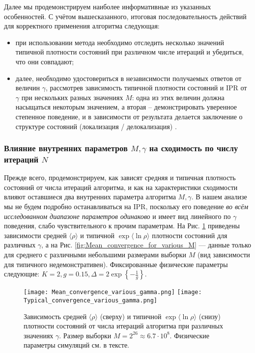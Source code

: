 Далее мы продемонстрируем наиболее информативные из указанных особенностей. С учётом вышесказанного, итоговая последовательность действий для корректного применения алгоритма следующая:
\begin{itemize}
	\item при использовании метода необходимо отследить несколько значений типичной плотности состояний при различном числе итераций и убедиться, что они совпадают;
	\item далее, необходимо удостовериться в независимости получаемых ответов от величин $\gamma$, рассмотрев зависимость типичной плотности состояний и IPR от $\gamma$ при нескольких разных значениях $M$: одна из этих величин должна насыщаться некоторым значением, а вторая -- демонстрировать уверенное степенное поведение, и в зависимости от результата делается заключение о структуре состояний (локализация / делокализация) \cite{AAT}.
\end{itemize}

\subsubsection{Влияние внутренних параметров $M, \gamma$ на сходимость по числу итераций $N$}
Прежде всего, продемонстрируем, как зависят средняя и типичная плотность состояний от числа итераций алгоритма, и как на характеристики сходимости влияют оставшиеся два внутренних параметра алгоритма $M, \gamma$. В нашем анализе мы не будем подробно останавливаться на IPR, поскольку его поведение \textit{во всём исследованном диапазоне параметров одинаково}  и имеет вид линейного по $\gamma$ поведения, слабо чувствительного к прочим параметрам. На Рис. \ref{fig:Convergence_for_various_gamma} приведены зависимости средней $\langle \rho \rangle$ и типичной $\exp \langle \ln \rho \rangle$ плотности состояний для различных $\gamma$, а на Рис. \ref{fig:Mean_convergence_for_various_M} --- данные только для среднего с различными небольшими размерами выборки $M$ (вид зависимости для типичного недемонстративен). Фиксированные физические параметры следующие: $K = 2, g = 0.15, \Delta = 2 \exp \left\{ -\frac{1}{g} \right\}$.

\begin{figure}[h!p]
	\label{fig:Convergence_for_various_gamma}
	\centering
	\texttt{[image: Mean\_convergence\_various\_gamma.png]}
	\texttt{[image: Typical\_convergence\_various\_gamma.png]}
	\caption{Зависимость средней $\langle \rho \rangle$ (сверху) и типичной $\exp \langle \ln \rho \rangle$ (снизу) плотности состояний от числа итераций алгоритма при различных значениях $\gamma$. Размер выборки $M = 2^{26} \approx 6.7 \cdot 10^{8}$. Физические параметры симуляций см. в тексте.}
\end{figure}

